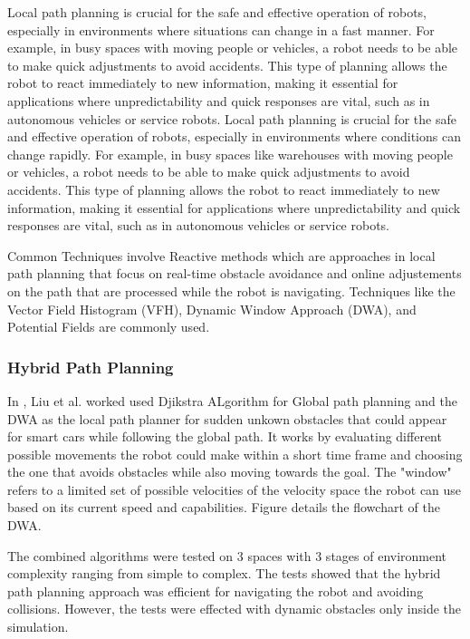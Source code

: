 Local path planning is crucial for the safe and effective operation of robots, especially in 
environments where situations can change in a fast manner. For example, in busy spaces with moving people 
or vehicles, a robot needs to be able to make quick adjustments to avoid accidents. This type of 
planning allows the robot to react immediately to new information, making it essential for applications 
where unpredictability and quick responses are vital, such as in autonomous vehicles or service robots.
Local path planning is crucial for the safe and effective operation of robots, especially in 
environments where conditions can change rapidly. For example, in busy spaces like warehouses 
with moving people or vehicles, a robot needs to be able to make quick adjustments to avoid accidents. 
This type of planning allows the robot to react immediately to new information, making it essential for 
applications where unpredictability and quick responses are vital, such as in autonomous vehicles 
or service robots.

Common Techniques involve Reactive methods which are approaches in local path planning that focus on real-time
obstacle avoidance and online adjustements on the path that are processed while the robot is navigating.
Techniques like the Vector Field Histogram (VFH), 
Dynamic Window Approach (DWA), and Potential Fields are commonly used.

\subsubsection {Hybrid Path Planning}


In \cite{R19}, Liu et al. worked used Djikstra ALgorithm for Global path planning and 
the DWA as the local path planner for sudden unkown obstacles that could 
appear for smart cars while following the global path.
It works by evaluating different possible movements the robot could make within a short time frame 
and choosing the one that avoids obstacles while also moving towards the goal. The "window" refers 
to a limited set of possible velocities of the velocity space the robot can use based on its current 
speed and capabilities. Figure  details the flowchart of the DWA. 

The combined algorithms were tested on 3 spaces with 3 stages of environment complexity ranging from 
simple to complex. The tests showed that the hybrid path planning approach was efficient for navigating the 
robot and avoiding collisions. However, the tests were effected with dynamic obstacles only inside the simulation.


